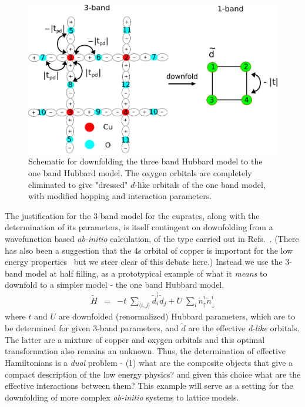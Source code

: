 \documentclass[prl,12pt,onecolumn,nofootinbib,notitlepage,english,superscriptaddress]{revtex4-1}
\begin{document}
\begin{figure}[htpb]
\centering
\includegraphics[width=1\linewidth]{./three_band_figure.pdf}
\caption{Schematic for downfolding the three band Hubbard model to the one band Hubbard model. 
The oxygen orbitals are completely eliminated to give "dressed" $d$-like orbitals of the one band model, with modified hopping 
and interaction parameters.}
\label{fig:threeband} 
\end{figure}	

The justification for the 3-band model for the cuprates, along with the determination of its parameters, 
is itself contingent on downfolding from a wavefunction based \emph{ab-initio} calculation, 
of the type carried out in Refs.~\cite{Wagner_Abbamonte}. (There has also been a suggestion that the 4s orbital of copper is important 
for the low energy properties~\cite{Pavirini} but we steer clear of this debate here.) 
Instead we use the 3-band model at half filling, as a prototypical example of what it \emph{means} to downfold to 
a simpler model - the one band Hubbard model, 
\begin{eqnarray}
	\tilde{H} &=&  -t \;\sum_{\langle i,j \rangle} \tilde{d}_i^{\dagger} \tilde{d}_j + U \;\sum_{i} \tilde{n}^{i}_{\uparrow} \tilde{n}^{i}_{\downarrow}
\label{eq:oneband}
\end{eqnarray}
where $t$ and $U$ are downfolded (renormalized) Hubbard parameters, which are to 
be determined for given 3-band parameters, and $\tilde{d}$ are the effective \emph{d-like} orbitals. 
The latter are a mixture of copper and oxygen orbitals and this optimal transformation also remains an unknown. Thus, 
the determination of effective Hamiltonians is a \emph{dual} problem - (1) what are the composite objects that give a 
compact description of the low energy physics? and given this choice what are the effective interactions between them?  
This example will serve as a setting for the downfolding of more complex \emph{ab-initio} systems to lattice 
models. 
\end{document}

